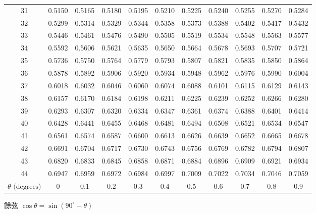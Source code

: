 {\begin{tabular}{|c|cccccccccc|}
31 & 0.5150 & 0.5165 & 0.5180 & 0.5195 & 0.5210 & 0.5225 & 0.5240 & 0.5255 & 0.5270 & 0.5284 \\
32 & 0.5299 & 0.5314 & 0.5329 & 0.5344 & 0.5358 & 0.5373 & 0.5388 & 0.5402 & 0.5417 & 0.5432 \\
33 & 0.5446 & 0.5461 & 0.5476 & 0.5490 & 0.5505 & 0.5519 & 0.5534 & 0.5548 & 0.5563 & 0.5577 \\
34 & 0.5592 & 0.5606 & 0.5621 & 0.5635 & 0.5650 & 0.5664 & 0.5678 & 0.5693 & 0.5707 & 0.5721 \\
\hline
35 & 0.5736 & 0.5750 & 0.5764 & 0.5779 & 0.5793 & 0.5807 & 0.5821 & 0.5835 & 0.5850 & 0.5864 \\
36 & 0.5878 & 0.5892 & 0.5906 & 0.5920 & 0.5934 & 0.5948 & 0.5962 & 0.5976 & 0.5990 & 0.6004 \\
37 & 0.6018 & 0.6032 & 0.6046 & 0.6060 & 0.6074 & 0.6088 & 0.6101 & 0.6115 & 0.6129 & 0.6143 \\
38 & 0.6157 & 0.6170 & 0.6184 & 0.6198 & 0.6211 & 0.6225 & 0.6239 & 0.6252 & 0.6266 & 0.6280 \\
39 & 0.6293 & 0.6307 & 0.6320 & 0.6334 & 0.6347 & 0.6361 & 0.6374 & 0.6388 & 0.6401 & 0.6414 \\
\hline
40 & 0.6428 & 0.6441 & 0.6455 & 0.6468 & 0.6481 & 0.6494 & 0.6508 & 0.6521 & 0.6534 & 0.6547 \\
41 & 0.6561 & 0.6574 & 0.6587 & 0.6600 & 0.6613 & 0.6626 & 0.6639 & 0.6652 & 0.6665 & 0.6678 \\
42 & 0.6691 & 0.6704 & 0.6717 & 0.6730 & 0.6743 & 0.6756 & 0.6769 & 0.6782 & 0.6794 & 0.6807 \\
43 & 0.6820 & 0.6833 & 0.6845 & 0.6858 & 0.6871 & 0.6884 & 0.6896 & 0.6909 & 0.6921 & 0.6934 \\
44 & 0.6947 & 0.6959 & 0.6972 & 0.6984 & 0.6997 & 0.7009 & 0.7022 & 0.7034 & 0.7046 & 0.7059 \\
\hline
$\theta\text{ (degrees)}$ & 0 & 0.1 & 0.2 & 0.3 & 0.4 & 0.5 & 0.6 & 0.7 & 0.8 & 0.9 \\ \hline
\end{tabular}\par}
\vspace{0.5em}\begin{center}\small 餘弦 $\cos\theta = \sin(90^\circ - \theta)$\end{center}
\clearpage

